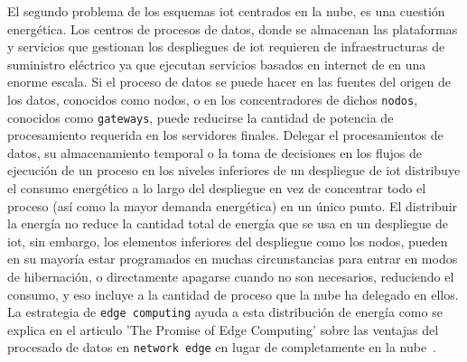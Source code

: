 El segundo problema de los esquemas \gls{iot} centrados en la nube, es una cuestión energética. Los centros de procesos de datos, donde se almacenan las plataformas y servicios que gestionan los despliegues de \gls{iot} requieren de infraestructuras de suministro eléctrico ya que ejecutan servicios basados en internet de en una enorme escala. Si el proceso de datos se puede hacer en las fuentes del origen de los datos, conocidos como nodos, o en los concentradores de dichos \verb|nodos|, conocidos como \verb|gateways|, puede reducirse la cantidad de potencia de procesamiento requerida en los servidores finales. Delegar el procesamientos de datos, su almacenamiento temporal o la toma de decisiones en los flujos de ejecución de un proceso en los niveles inferiores de un despliegue de \gls{iot} distribuye el consumo energético a lo largo del despliegue en vez de concentrar todo el proceso (así como la mayor demanda energética) en un único punto. El distribuir la energía no reduce la cantidad total de energía que se usa en un despliegue de \gls{iot}, sin embargo, los elementos inferiores del despliegue como los nodos, pueden en su mayoría estar programados en muchas circunstancias para entrar en modos de hibernación, o directamente apagarse cuando no son necesarios, reduciendo el consumo, y eso incluye a la cantidad de proceso que la nube ha delegado en ellos. La estrategia de \verb|edge computing| ayuda a esta distribución de energía como se explica en el articulo 'The Promise of Edge Computing' sobre las ventajas del procesado de datos en \verb|network edge| en lugar de completamente en la nube~\cite{shi2016promise}.

\vspace{1cm}

